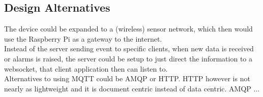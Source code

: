 \subsection{Design Alternatives}
The device could be expanded to a (wireless) sensor network, which then would use the Raspberry Pi as a gateway to the internet.\\
Instead of the server sending event to specific clients, when new data is received or alarms is raised, the server could be setup to just direct the information to a websocket, that client application then can listen to.\\
Alternatives to using MQTT could be AMQP or HTTP. HTTP however is not nearly as lightweight and it is document centric instead of data centric. AMQP ...